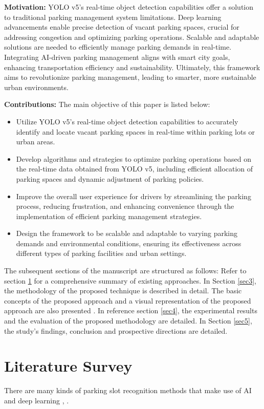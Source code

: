 \documentclass[conference]{IEEEtran}
\begin{document}
\textbf{Motivation:} YOLO v5's real-time object detection capabilities offer a solution to traditional parking management system limitations. Deep learning advancements enable precise detection of vacant parking spaces, crucial for addressing congestion and optimizing parking operations. Scalable and adaptable solutions are needed to efficiently manage parking demands in real-time. Integrating AI-driven parking management aligns with smart city goals, enhancing transportation efficiency and sustainability. Ultimately, this framework aims to revolutionize parking management, leading to smarter, more sustainable urban environments.

\textbf{Contributions:} The main objective of this paper is listed below:
\begin{itemize}
    \item Utilize YOLO v5's real-time object detection capabilities to accurately identify and locate vacant parking spaces in real-time within parking lots or urban areas.    
    \item Develop algorithms and strategies to optimize parking operations based on the real-time data obtained from YOLO v5, including efficient allocation of parking spaces and dynamic adjustment of parking policies.   
    \item Improve the overall user experience for drivers by streamlining the parking process, reducing frustration, and enhancing convenience through the implementation of efficient parking management strategies.
    \item Design the framework to be scalable and adaptable to varying parking demands and environmental conditions, ensuring its effectiveness across different types of parking facilities and urban settings.
\end{itemize}

The subsequent sections of the manuscript are structured as follows: Refer to section \ref{sec2} for a comprehensive summary of existing approaches. In Section \ref{sec3}, the methodology of the proposed technique is described in detail. The basic concepts of the proposed approach and a visual representation of the proposed approach are also presented . In reference section \ref{sec4}, the experimental results and the evaluation of the proposed methodology are detailed. In Section \ref{sec5}, the study's findings, conclusion and prospective directions are detailed.

\section{Literature Survey}\label{sec2}
There are many kinds of parking slot recognition methods that make use of AI and deep learning \cite{perkovic2020smart}, \cite{praveen2023convolutional}.
\end{document}

